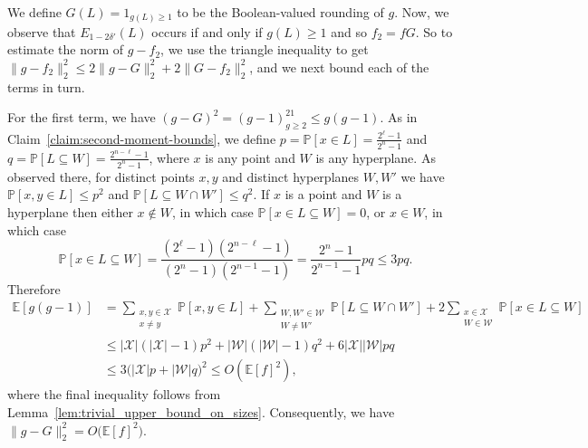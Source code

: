 \documentclass[11pt]{article}
\newcommand\E{\mathbb{E}}
\newcommand\norm[1]{\| #1 \|}
\newcommand\Expect[2]{{\mathop{\mathbb{E}}_{#1}\left[ {#2} \right]}}
\renewcommand\leq{\leqslant}
\begin{document}

We define $ G(L)=1_{g(L)\ge 1}$ to be the Boolean-valued rounding of $g$. Now, we observe that $E_{1-2\delta'}(L)$ occurs if and only if $g(L)\ge 1$ and so $f_2 = fG$. So to estimate the norm of $g-f_2$, we use  the triangle inequality to get $\norm{g-f_2}_2^2
  \le 2\norm{g-G}_2^2+2\norm{G-f_2}_2^2$, and we next bound each of the terms in turn. 
  
  For the first term, we have $(g-G)^2=(g-1)^21_{g\ge 2}
  \le g(g-1)$. 
  As in Claim~\ref{claim:second-moment-bounds}, we define $p = \mathbb P[x \in L] = \frac{2^\ell-1}{2^n-1}$ and $q = \mathbb P[L \subseteq W] = \frac{2^{n-\ell}-1}{2^n-1}$, where $x$ is any point and $W$ is any hyperplane. As observed there, for distinct points $x,y$ and distinct hyperplanes $W,W'$ we have $\mathbb P[x,y \in L] \le p^2$ and $\mathbb P[L \subseteq W \cap W'] \le q^2$. If $x$ is a point and $W$ is a hyperplane then either $x \notin W$, in which case $\mathbb P[x \in L \subseteq W] = 0$, or $x \in W$, in which case
  \[
   \mathbb P[x \in L \subseteq W] = \frac{(2^\ell-1)(2^{n-\ell}-1)}{(2^n-1)(2^{n-1}-1)} = \frac{2^n-1}{2^{n-1}-1} pq \le 3pq.
  \]
  Therefore
\begin{align*}
  \E[g(g-1)]
  &=\sum_{\substack{x,y\in\mathcal{X}\\x\ne y}}\mathbb P[x,y\in L]
    +\sum_{\substack{W,W'\in\mathcal{W}\\W\ne W'}}\mathbb P[L\subseteq W\cap W']+2\sum_{\substack{x\in\mathcal{X}\\W\in\mathcal{W}}}\mathbb P[x\in L\subseteq W]\\
  &\le |\mathcal{X}|(|\mathcal{X}|-1)p^2
    +|\mathcal{W}|(|\mathcal{W}|-1)q^2
    +6|\mathcal{X}||\mathcal{W}|pq\\
  &\le 3\bigl(|\mathcal{X}|p+|\mathcal{W}|q\bigr)^2 \leq O(\E[f]^2),
\end{align*}
where the final inequality follows from Lemma~\ref{lem:trivial_upper_bound_on_sizes}. Consequently, we have $\norm{g-G}_2^2=O\bigl(\E[f]^2\bigr)$.
\end{document}
